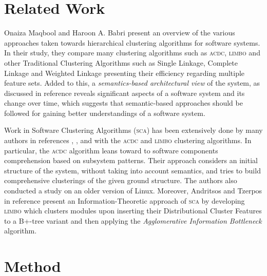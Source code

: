 \documentclass[sigconf]{acmart}
\begin{document}
\section{Related Work}

Onaiza Maqbool and Haroon A. Babri \cite{maqbool_overview} present an
overview of the various approaches taken towards hierarchical clustering algorithms
for software systems. In their study, they compare many clustering algorithms
such as \textsc{acdc}, \textsc{limbo} and other Traditional Clustering Algorithms such as Single
Linkage, Complete Linkage and Weighted Linkage presenting their efficiency regarding 
multiple feature sets. 
Added to this, a \emph{semantics-based architectural view} of the system, as discussed in reference
\cite{large_study} reveals significant aspects of a software system and its change over 
time, which suggests that semantic-based approaches should be followed for gaining better 
understandings of a software system. 

Work in Software Clustering Algorithms (\textsc{sca}) has been extensively done by many authors in
references \cite{mojo}, \cite{stability}, \cite{acdc} and \cite{limbo} with the \textsc{acdc}
and \textsc{limbo} clustering algorithms. 
In particular, the \textsc{acdc} algorithm leans toward to software components comprehension 
based on subsystem patterns. Their approach considers an initial structure of the system, 
without taking into account semantics, and tries to build comprehensive clusterings of the given ground structure. 
The authors also conducted a study on an older version of  Linux. 
Moreover, Andritsos and Tzerpos in reference \cite{limbo} present an Information-Theoretic 
approach of \textsc{sca} by developing \textsc{limbo} which clusters modules upon inserting their Distributional Cluster Features 
to a B+-tree variant and then applying the \emph{Agglomerative Information Bottleneck} algorithm.


\section{Method} 
\end{document}
